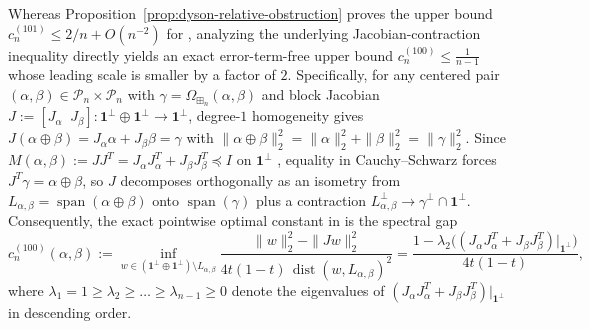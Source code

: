 \documentclass[11pt,a4paper]{article}
\theoremstyle{definition}
\DeclareMathOperator{\Span}{span}
\newcommand{\boxplusn}{\boxplus_n}
\newcommand{\one}{\mathbf{1}}
\begin{document}
Whereas Proposition~\ref{prop:dyson-relative-obstruction} proves the upper bound $c_n^{(101)} \le 2/n + O(n^{-2})$ for \cite[eq.~(101)]{HH2026}, analyzing the underlying Jacobian-contraction inequality \cite[Conjecture~8.1 / eq.~(100)]{HH2026} directly yields an exact error-term-free upper bound $c_n^{(100)} \le \frac{1}{n-1}$ whose leading scale is smaller by a factor of $2$. Specifically, for any centered pair $(\alpha, \beta) \in \mathcal{P}_n \times \mathcal{P}_n$ with $\gamma = \Omega_{\boxplusn}(\alpha, \beta)$ and block Jacobian $J := [J_\alpha\;\; J_\beta] : \one^\perp \oplus \one^\perp \to \one^\perp$, degree-$1$ homogeneity gives $J(\alpha \oplus \beta) = J_\alpha \alpha + J_\beta \beta = \gamma$ with $\|\alpha \oplus \beta\|_2^2 = \|\alpha\|_2^2 + \|\beta\|_2^2 = \|\gamma\|_2^2$. Since $M(\alpha, \beta) := J J^T = J_\alpha J_\alpha^T + J_\beta J_\beta^T \preceq I$ on $\one^\perp$ \cite[Proposition~5.3]{GSS2026}, equality in Cauchy--Schwarz forces $J^T \gamma = \alpha \oplus \beta$, so $J$ decomposes orthogonally as an isometry from $L_{\alpha,\beta} = \Span(\alpha \oplus \beta)$ onto $\Span(\gamma)$ plus a contraction $L_{\alpha,\beta}^\perp \to \gamma^\perp \cap \one^\perp$. Consequently, the exact pointwise optimal constant in \cite[Conjecture~8.1 / eq.~(100)]{HH2026} is the spectral gap
\begin{equation}
\label{eq:cn100-def}
c_n^{(100)}(\alpha, \beta)
:= \inf_{w \in (\one^\perp \oplus \one^\perp) \setminus L_{\alpha,\beta}} \frac{\|w\|_2^2 - \|J w\|_2^2}{4t(1-t)\,\operatorname{dist}(w, L_{\alpha,\beta})^2}
= \frac{1 - \lambda_2\big((J_\alpha J_\alpha^T + J_\beta J_\beta^T)|_{\one^\perp}\big)}{4t(1-t)},
\end{equation}
where $\lambda_1 = 1 \ge \lambda_2 \ge \dots \ge \lambda_{n-1} \ge 0$ denote the eigenvalues of $(J_\alpha J_\alpha^T + J_\beta J_\beta^T)|_{\one^\perp}$ in descending order.
\end{document}
